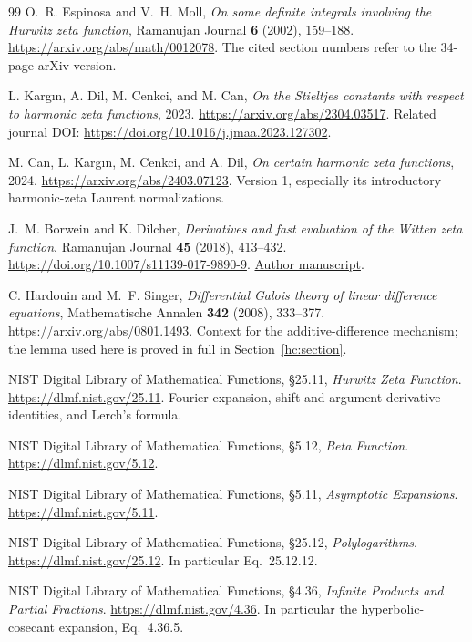 \documentclass[11pt]{article}
\numberwithin{equation}{section}
\theoremstyle{definition}
\theoremstyle{remark}
\begin{document}
\begin{thebibliography}{99}
O.~R. Espinosa and V.~H. Moll,
\emph{On some definite integrals involving the Hurwitz zeta function},
Ramanujan Journal \textbf{6} (2002), 159--188.
\url{https://arxiv.org/abs/math/0012078}.
The cited section numbers refer to the 34-page arXiv version.

L. Karg\i n, A. Dil, M. Cenkci, and M. Can,
\emph{On the Stieltjes constants with respect to harmonic zeta functions},
2023. \url{https://arxiv.org/abs/2304.03517}.
Related journal DOI: \url{https://doi.org/10.1016/j.jmaa.2023.127302}.

M. Can, L. Karg\i n, M. Cenkci, and A. Dil,
\emph{On certain harmonic zeta functions}, 2024.
\url{https://arxiv.org/abs/2403.07123}.
Version 1, especially its introductory harmonic-zeta Laurent
normalizations.

J.~M. Borwein and K. Dilcher,
\emph{Derivatives and fast evaluation of the Witten zeta function},
Ramanujan Journal \textbf{45} (2018), 413--432.
\url{https://doi.org/10.1007/s11139-017-9890-9}.
\href{https://carmamaths.org/resources/jon/omega3.pdf}{Author manuscript}.

C. Hardouin and M.~F. Singer,
\emph{Differential Galois theory of linear difference equations},
Mathematische Annalen \textbf{342} (2008), 333--377.
\url{https://arxiv.org/abs/0801.1493}.
Context for the additive-difference mechanism; the lemma used here is
proved in full in Section~\ref{hc:section}.

NIST Digital Library of Mathematical Functions,
\S25.11, \emph{Hurwitz Zeta Function}.
\url{https://dlmf.nist.gov/25.11}.
Fourier expansion, shift and argument-derivative identities, and
Lerch's formula.

NIST Digital Library of Mathematical Functions,
\S5.12, \emph{Beta Function}.
\url{https://dlmf.nist.gov/5.12}.

NIST Digital Library of Mathematical Functions,
\S5.11, \emph{Asymptotic Expansions}.
\url{https://dlmf.nist.gov/5.11}.

NIST Digital Library of Mathematical Functions,
\S25.12, \emph{Polylogarithms}.
\url{https://dlmf.nist.gov/25.12}.
In particular Eq.~25.12.12.

NIST Digital Library of Mathematical Functions,
\S4.36, \emph{Infinite Products and Partial Fractions}.
\url{https://dlmf.nist.gov/4.36}.
In particular the hyperbolic-cosecant expansion, Eq.~4.36.5.

\end{thebibliography}
\end{document}
